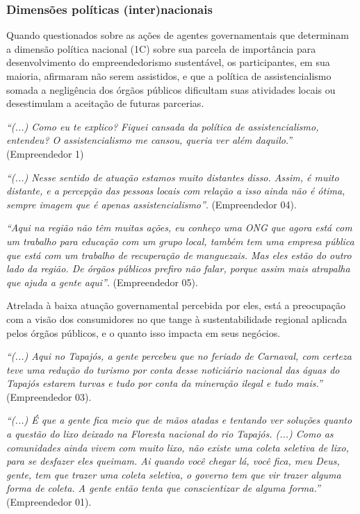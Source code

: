 \subsubsection*{Dimensões políticas (inter)nacionais}

Quando questionados sobre as ações de agentes governamentais que determinam a dimensão política nacional (1C) sobre sua parcela de importância para desenvolvimento do empreendedorismo sustentável, os participantes, em sua maioria, afirmaram não serem assistidos, e que a política de assistencialismo somada a negligência dos órgãos públicos dificultam suas atividades locais ou desestimulam a aceitação de futuras parcerias. 

\textit{“(...) Como eu te explico? Fiquei cansada da política de assistencialismo, entendeu? O assistencialismo me cansou, queria ver além daquilo.”} (Empreendedor 1)

\textit{“(...) Nesse sentido de atuação estamos muito distantes disso. Assim, é muito distante, e a percepção das pessoas locais com relação a isso ainda não é ótima, sempre imagem que é apenas assistencialismo”}. (Empreendedor 04).

\textit{“Aqui na região não têm muitas ações, eu conheço uma ONG que agora está com um trabalho para educação com um grupo local, também tem uma empresa pública que está com um trabalho de recuperação de manguezais. Mas eles estão do outro lado da região. De órgãos públicos prefiro não falar, porque assim mais atrapalha que ajuda a gente aqui”}. (Empreendedor 05). 

Atrelada à baixa atuação governamental percebida por eles, está a preocupação com a visão dos consumidores no que tange à sustentabilidade regional aplicada pelos órgãos públicos, e o quanto isso impacta em seus negócios.

\textit{“(...) Aqui no Tapajós, a gente percebeu que no feriado de Carnaval, com certeza teve uma redução do turismo por conta desse noticiário nacional das águas do Tapajós estarem turvas e tudo por conta da mineração ilegal e tudo mais.”} (Empreendedor 03). 

\textit{“(...) É que a gente fica meio que de mãos atadas e tentando ver soluções quanto a questão do lixo deixado na Floresta nacional do rio Tapajós. (...) Como as comunidades ainda vivem com muito lixo, não existe uma coleta seletiva de lixo, para se desfazer eles queimam. Ai quando você chegar lá, você fica, meu Deus, gente, tem que trazer uma coleta seletiva, o governo tem que vir trazer alguma forma de coleta. A gente então tenta que conscientizar de alguma forma.”} (Empreendedor 01).

